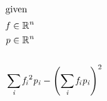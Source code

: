 \documentclass[12pt]{article}
\let\originalleft\left
\let\originalright\right
\renewcommand{\left}{\mathopen{}\mathclose\bgroup\originalleft}
\renewcommand{\right}{\aftergroup\egroup\originalright}
\begin{document}
\begin{center}
\resizebox{\textwidth}{!} 
{
\begin{minipage}[c]{\textwidth}
\begin{align*}
\intertext{given} 
\mathit{f} & \in \mathbb{R}^{ \mathit{n}} \\
\mathit{p} & \in \mathbb{R}^{ \mathit{n}} \\
\\
 \omit \span \sum_\mathit{i} {\mathit{f}_{ \mathit{i} }}^{2}\mathit{p}_{ \mathit{i} } - {\left( \sum_\mathit{i} \mathit{f}_{ \mathit{i} }\mathit{p}_{ \mathit{i} } \right)}^{2} \\
\end{align*}
\end{minipage}
}
\end{center}
\end{document}
